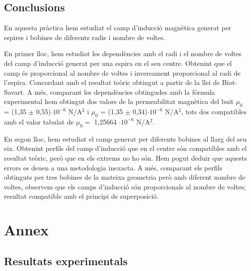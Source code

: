 \documentclass[11pt]{article}
\numberwithin{equation}{section}
\numberwithin{figure}{section}
\numberwithin{table}{section}
\begin{document}
\subsection{Conclusions}\label{sec: conclusions}
En aquesta pràctica hem estudiat el camp d'inducció magnètica generat per espires i bobines de diferents radis i nombre de voltes. 

En primer lloc, hem estudiat les dependències amb el radi i el nombre de voltes del camp d'inducció generat per una espira en el seu centre. Obtenint que el camp és proporcional al nombre de voltes i inversament proporcional al radi de l'espira. Concordant amb el resultat teòric obtingut a partir de la llei de Biot-Savart. A més, comparant les dependències obtingudes amb la fórmula experimental hem obtingut dos valors de la permeabilitat magnètica del buit $\mu_0$ = (1,35 $\pm$ 0,55)$\cdot10^{-6}$ N/A$^2$ i $\mu_0$ = (1,35 $\pm$ 0,34)$\cdot10^{-6}$ N/A$^2$, tots dos compatibles amb el valor tabulat de $\mu_0 =$  1,25664 $\cdot 10^{-6}$ N/A$^2$.

En segon lloc, hem estudiat el camp generat per diferents bobines al llarg del seu eix. Obtenint perfils del camp d'inducció que en el centre són compatibles amb el resultat teòric, però que en els extrems no ho són. Hem pogut deduir que aquests errors es deuen a una metodologia inexacta. A més, comparant els perfils obtinguts per tres bobines de la mateixa geometria però amb diferent nombre de voltes, observem que els camps d'inducció són proporcionals al nombre de voltes; resultat compatible amb el principi de superposició.



\newpage

\appendix
\section{Annex}


\subsection{Resultats experimentals}\label{taules_dades_exp}
\end{document}
